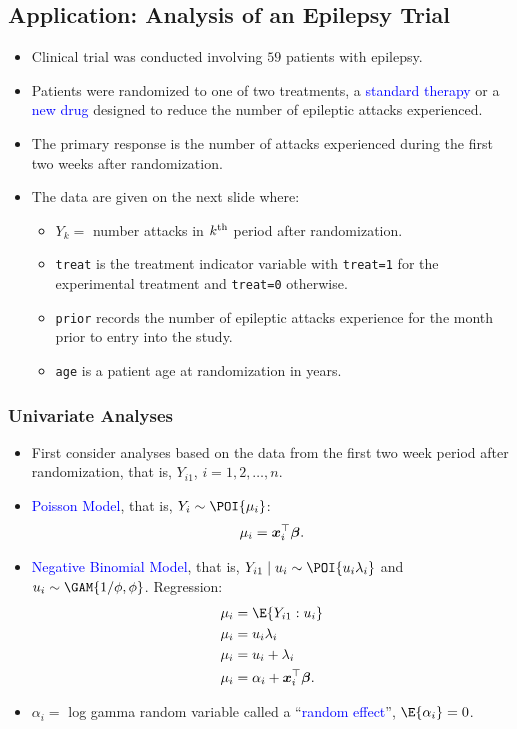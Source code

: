 \documentclass[oneside]{book}\usepackage[]{graphicx}\usepackage[svgnames]{xcolor}
\providecommand\given{} %
\renewcommand\given{\nonscript\:\delimsize\vert\nonscript\:\mathopen{}}%
\renewcommand\given{\nonscript\:\delimsize\vert\nonscript\:\mathopen{}}%
\renewcommand\given{\nonscript\:\delimsize\vert\nonscript\:\mathopen{}}%
\renewcommand\given{\nonscript\:\delimsize\vert\nonscript\:\mathopen{}}%
\renewcommand\given{\nonscript\:\delimsize\vert\nonscript\:\mathopen{}}%
\renewcommand\given{\nonscript\:\delimsize\vert\nonscript\:\mathopen{}}%
\renewcommand\given{\nonscript\:\delimsize\vert\nonscript\:\mathopen{}}%
\renewcommand\given{\nonscript\:\delimsize\vert\nonscript\:\mathopen{}}%
\renewcommand\given{\nonscript\:\delimsize\vert\nonscript\:\mathopen{}}%
\renewcommand\given{\nonscript\:\delimsize\vert\nonscript\:\mathopen{}}%
\renewcommand\given{\nonscript\:\delimsize\vert\nonscript\:\mathopen{}}%
\renewcommand\given{\nonscript\:\delimsize\vert\nonscript\:\mathopen{}}%
\let\log\relax%
\renewcommand\given{:}
\providecommand{\Vector}[1]{\bm{#1}}%
\begin{document}
\subsection*{Application: Analysis of an Epilepsy Trial}
\begin{itemize}
    \item Clinical trial was conducted involving $59$ patients with epilepsy.
    \item Patients were randomized to one of two treatments, a \textcolor{Blue}{standard therapy} or a \textcolor{Blue}{new drug}
          designed to reduce the number of epileptic attacks experienced.
    \item The primary response is the number of attacks experienced during the first two
          weeks after randomization.
    \item The data are given on the next slide where:
          \begin{itemize}
              \item $ Y_k= $ number attacks in $ k\textsuperscript{th} $ period after randomization.
              \item \texttt{treat} is the treatment indicator variable with \texttt{treat=1} for the experimental treatment
                    and \texttt{treat=0} otherwise.
              \item \texttt{prior} records the number of epileptic attacks experience for the month prior to entry into the study.
              \item \texttt{age} is a patient age at randomization in years.
          \end{itemize}
\end{itemize}
\subsubsection*{Univariate Analyses}
\begin{itemize}
    \item First consider analyses based on the data from the first two week period after
          randomization, that is, $ Y_{i1} $, $ i=1,2,\ldots,n $.
    \item \textcolor{Blue}{Poisson Model}, that is, $ Y_i \sim \POI{\mu_i} $:
          \[ \log{\mu_i}=\Vector{x}_i^\top \Vector{\beta}. \]
    \item \textcolor{Blue}{Negative Binomial Model}, that is, $ Y_{i1}\mid u_i \sim \POI{u_i\lambda_i} $ and $ u_i \sim \GAM{1/\phi,\phi} $. Regression:
          \begin{align*}
              \mu_i       & =\E{Y_{i1}\given u_i}                       \\
              \mu_i       & =u_i\lambda_i                               \\
              \log{\mu_i} & =\log{u_i}+\log{\lambda_i}                  \\
              \log{\mu_i} & =\alpha_i+\Vector{x}_i^\top \Vector{\beta}.
          \end{align*}
    \item $ \alpha_i= $ log gamma random variable called a ``\textcolor{Blue}{random effect}'', $ \E{\alpha_i}=0 $.
\end{itemize}
\end{document}
